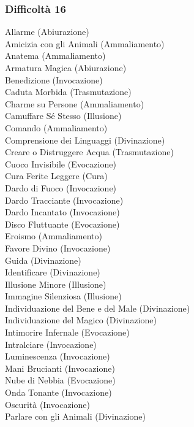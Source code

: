 \begin{multicols}{3}
	\subsubsection{Difficoltà 16}
	Allarme (Abiurazione)\\
	Amicizia con gli Animali (Ammaliamento)\\
	Anatema (Ammaliamento)\\
	Armatura Magica (Abiurazione)\\
	Benedizione (Invocazione)\\
	Caduta Morbida (Trasmutazione)\\
	Charme su Persone (Ammaliamento)\\
	Camuffare Sé Stesso (Illusione)\\
	Comando (Ammaliamento)\\
	Comprensione dei Linguaggi (Divinazione)\\
	Creare o Distruggere Acqua (Trasmutazione)\\
	Cuoco Invisibile (Evocazione)\\
	Cura Ferite Leggere (Cura)\\
	Dardo di Fuoco (Invocazione)\\
	Dardo Tracciante (Invocazione)\\
	Dardo Incantato (Invocazione)\\
	Disco Fluttuante (Evocazione)\\
	Eroismo (Ammaliamento)\\
	Favore Divino (Invocazione)\\
	Guida (Divinazione)\\
	Identificare (Divinazione)\\
	Illusione Minore (Illusione)\\
	Immagine Silenziosa (Illusione)\\
	Individuazione del Bene e del Male (Divinazione)\\
	Individuazione del Magico (Divinazione)\\
	Intimorire Infernale (Evocazione)\\
	Intralciare (Invocazione)\\
	Luminescenza (Invocazione)\\
	Mani Brucianti (Invocazione)\\
	Nube di Nebbia (Evocazione)\\
	Onda Tonante (Invocazione)\\
	Oscurità (Invocazione)\\
	Parlare con gli Animali (Divinazione)\\

\end{multicols}
